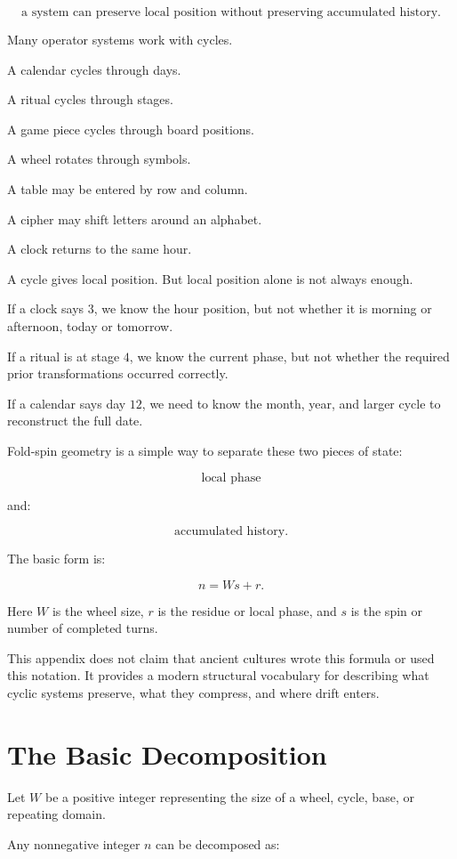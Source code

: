 \documentclass[11pt]{book}
\begin{document}
\[
\text{a system can preserve local position without preserving accumulated history}.
\]

Many operator systems work with cycles.

A calendar cycles through days.

A ritual cycles through stages.

A game piece cycles through board positions.

A wheel rotates through symbols.

A table may be entered by row and column.

A cipher may shift letters around an alphabet.

A clock returns to the same hour.

A cycle gives local position. But local position alone is not always enough.

If a clock says \(3\), we know the hour position, but not whether it is morning or afternoon, today or tomorrow.

If a ritual is at stage \(4\), we know the current phase, but not whether the required prior transformations occurred correctly.

If a calendar says day \(12\), we need to know the month, year, and larger cycle to reconstruct the full date.

Fold-spin geometry is a simple way to separate these two pieces of state:

\[
\text{local phase}
\]

and:

\[
\text{accumulated history}.
\]

The basic form is:

\[
n = Ws + r.
\]

Here \(W\) is the wheel size, \(r\) is the residue or local phase, and \(s\) is the spin or number of completed turns.

This appendix does not claim that ancient cultures wrote this formula or used this notation. It provides a modern structural vocabulary for describing what cyclic systems preserve, what they compress, and where drift enters.

\section{The Basic Decomposition}

Let \(W\) be a positive integer representing the size of a wheel, cycle, base, or repeating domain.

Any nonnegative integer \(n\) can be decomposed as:
\end{document}
